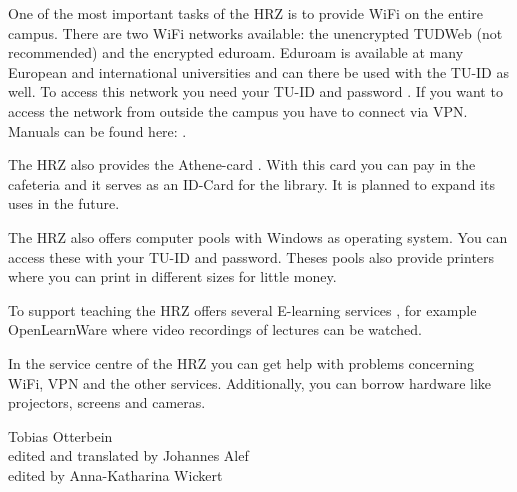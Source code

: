 {    One of the most important tasks of the HRZ is to provide WiFi on the entire campus. There are two WiFi networks available: the unencrypted TUDWeb (not recommended) and the encrypted eduroam. Eduroam is available at many European and international universities and can there be used with the TU-ID as well. To access this network you need your TU-ID and password \footnotemark[12]. If you want to access the network from outside the campus you have to connect via VPN. Manuals can be found here: \footnotemark[12].

    The HRZ also provides the Athene-card \footnotemark[13]. With this card you can pay in the cafeteria and it serves as an ID-Card for the library. It is planned to expand its uses in the future.

    The HRZ also offers computer pools with Windows as operating system. You can access these with your TU-ID and password. Theses pools also provide printers where you can print in different sizes for little money.

    To support teaching the HRZ offers several E-learning services \footnotemark[14], for example OpenLearnWare where video recordings of lectures can be watched.

    In the service centre of the HRZ \footnotemark[15] you can get help with problems concerning WiFi, VPN and the other services. Additionally, you can borrow hardware like projectors, screens and cameras.
}
{Tobias Otterbein\\edited and translated by Johannes Alef\\edited by Anna-Katharina Wickert}




\newpage
